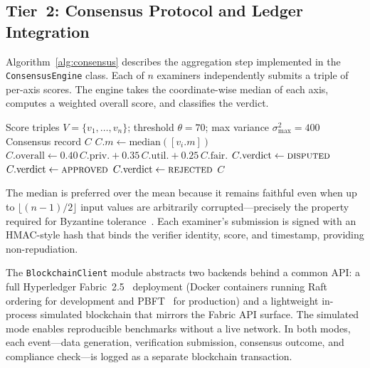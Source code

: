 \subsection{Tier~2: Consensus Protocol and Ledger Integration}

Algorithm~\ref{alg:consensus} describes the aggregation step implemented in the \texttt{ConsensusEngine} class. Each of $n$ examiners independently submits a triple of per-axis scores. The engine takes the coordinate-wise median of each axis, computes a weighted overall score, and classifies the verdict.

\begin{algorithm}[h]
\caption{Median-based verification consensus.}
\label{alg:consensus}
\begin{algorithmic}[1]
\REQUIRE Score triples $V=\{v_1,\dots,v_n\}$; threshold $\theta=70$; max variance $\sigma^2_{\max}=400$
\ENSURE Consensus record $C$
    \STATE $C.m \leftarrow \text{median}([v_i.m])$
\ENDFOR
\STATE $C.\text{overall} \leftarrow 0.40\,C.\text{priv.} + 0.35\,C.\text{util.} + 0.25\,C.\text{fair.}$
    \STATE $C.\text{verdict} \leftarrow \textsc{disputed}$
    \STATE $C.\text{verdict} \leftarrow \textsc{approved}$
\ELSE
    \STATE $C.\text{verdict} \leftarrow \textsc{rejected}$
\ENDIF
\RETURN $C$
\end{algorithmic}
\end{algorithm}

The median is preferred over the mean because it remains faithful even when up to $\lfloor(n{-}1)/2\rfloor$ input values are arbitrarily corrupted---precisely the property required for Byzantine tolerance~\cite{lamport1982byzantine}. Each examiner's submission is signed with an HMAC-style hash that binds the verifier identity, score, and timestamp, providing non-repudiation.

The \texttt{BlockchainClient} module abstracts two backends behind a common API: a full Hyperledger Fabric~2.5~\cite{androulaki2018hyperledger} deployment (Docker containers running Raft ordering for development and PBFT~\cite{castro1999practical} for production) and a lightweight in-process simulated blockchain that mirrors the Fabric API surface. The simulated mode enables reproducible benchmarks without a live network. In both modes, each event---data generation, verification submission, consensus outcome, and compliance check---is logged as a separate blockchain transaction.

